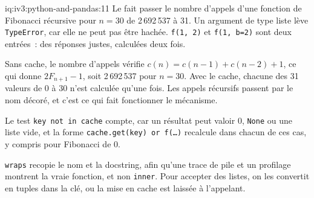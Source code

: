 \begin{solution}{iq:iv3:python-and-pandas:11}
Le  fait passer le nombre d'appels d'une fonction de Fibonacci récursive pour $n = 30$ de 2\,692\,537 à 31. Un argument de type liste lève \texttt{TypeError}, car elle ne peut pas être hachée. \texttt{f(1, 2)} et \texttt{f(1, b=2)} sont deux entrées~: des réponses justes, calculées deux fois.
\label{lst:iv3:pp:memo}

Sans cache, le nombre d'appels vérifie $c(n) = c(n - 1) + c(n - 2) + 1$, ce qui donne $2F_{n+1} - 1$, soit 2\,692\,537 pour $n = 30$. Avec le cache, chacune des 31 valeurs de 0 à 30 n'est calculée qu'une fois. Les appels récursifs passent par le nom décoré, et c'est ce qui fait fonctionner le mécanisme.

Le test \texttt{key not in cache} compte, car un résultat peut valoir 0, \texttt{None} ou une liste vide, et la forme \texttt{cache.get(key) or f(\dots)} recalcule dans chacun de ces cas, y compris pour Fibonacci de 0.

\texttt{wraps} recopie le nom et la docstring, afin qu'une trace de pile et un profilage montrent la vraie fonction, et non \texttt{inner}. Pour accepter des listes, on les convertit en tuples dans la clé, ou la mise en cache est laissée à l'appelant.

\end{solution}

